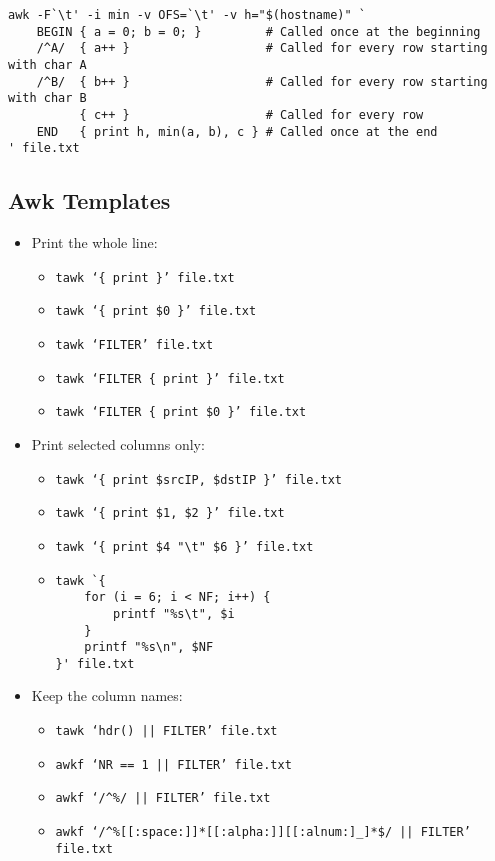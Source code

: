 \documentclass[documentation]{subfiles}
\begin{document}
\begin{verbatim}
awk -F`\t' -i min -v OFS=`\t' -v h="$(hostname)" `
    BEGIN { a = 0; b = 0; }         # Called once at the beginning
    /^A/  { a++ }                   # Called for every row starting with char A
    /^B/  { b++ }                   # Called for every row starting with char B
          { c++ }                   # Called for every row
    END   { print h, min(a, b), c } # Called once at the end
' file.txt
\end{verbatim}

\subsection{Awk Templates}
\begin{itemize}
    \item Print the whole line:
        \begin{itemize}
            \item {\tt tawk `\{ print \}' file.txt}
            \item {\tt tawk `\{ print \$0 \}' file.txt}
            \item {\tt tawk `FILTER' file.txt}
            \item {\tt tawk `FILTER \{ print \}' file.txt}
            \item {\tt tawk `FILTER \{ print \$0 \}' file.txt}
        \end{itemize}
    \item Print selected columns only:
        \begin{itemize}
            \item {\tt tawk `\{ print \$srcIP, \$dstIP \}' file.txt}
            \item {\tt tawk `\{ print \$1, \$2 \}' file.txt}
            \item {\tt tawk `\{ print \$4 "\textbackslash{}t" \$6 \}' file.txt}
            \item \begin{verbatim}
tawk `{
    for (i = 6; i < NF; i++) {
        printf "%s\t", $i
    }
    printf "%s\n", $NF
}' file.txt
\end{verbatim}
        \end{itemize}
    \item Keep the column names:
        \begin{itemize}
            \item {\tt tawk `hdr() || FILTER' file.txt}
            \item {\tt awkf `NR == 1 || FILTER' file.txt}
            \item {\tt awkf `/\textasciicircum{}\%/ || FILTER' file.txt}
            \item {\tt awkf `/\textasciicircum{}\%[[:space:]]*[[:alpha:]][[:alnum:]\_]*\$/ || FILTER' file.txt}
        \end{itemize}


\end{itemize}
\end{document}

